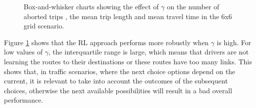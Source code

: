 \documentclass{RITA}
\begin{document}
\begin{figure}
  \centering
  \caption{Box-and-whisker charts showing the effect of $\gamma$ on the number of aborted trips , the mean trip length  and mean travel time  in the 6x6 grid scenario.}
  \label{fig:qLearningGamma-grid}
\end{figure}

Figure \ref{fig:qLearningGamma-grid} shows that the RL approach performs more robustly when $\gamma$ is high. For low values of $\gamma$, the interquartile range is large, which means that drivers are not learning the routes to their destinations or these routes have too many links. This shows that, in traffic scenarios, where the next choice options depend on the current, it is relevant to take into account the outcomes of the subsequent choices, otherwise the next available possibilities will result in a bad overall performance.
\end{document}
